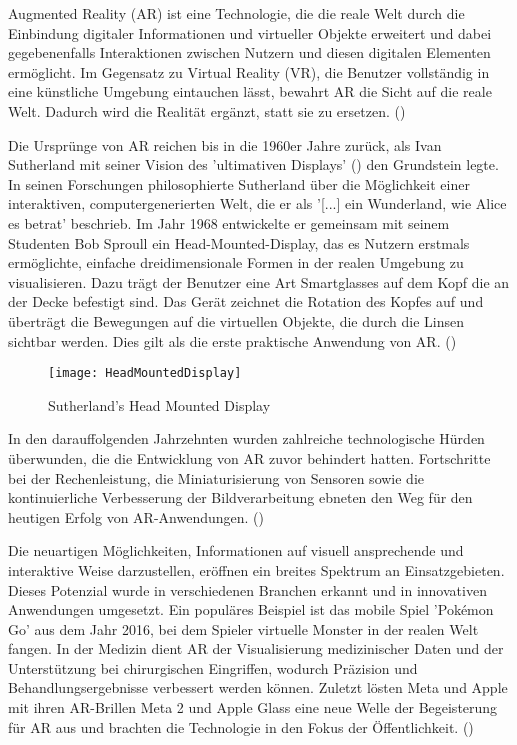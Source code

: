 Augmented Reality (AR) ist eine Technologie, die die reale Welt durch die Einbindung digitaler Informationen und virtueller Objekte erweitert und dabei gegebenenfalls Interaktionen zwischen Nutzern und diesen digitalen Elementen ermöglicht. Im Gegensatz zu Virtual Reality (VR), die Benutzer vollständig in eine künstliche Umgebung eintauchen lässt, bewahrt AR die Sicht auf die reale Welt. Dadurch wird die Realität ergänzt, statt sie zu ersetzen. (\cite{azuma1997ar})

Die Ursprünge von AR reichen bis in die 1960er Jahre zurück, als Ivan Sutherland mit seiner Vision des 'ultimativen Displays' (\citet{sutherland1965ultimateDisplay}) den Grundstein legte. In seinen Forschungen philosophierte Sutherland über die Möglichkeit einer interaktiven, computergenerierten Welt, die er als '[...] ein Wunderland, wie Alice es betrat' beschrieb. Im Jahr 1968 entwickelte er gemeinsam mit seinem Studenten Bob Sproull ein Head-Mounted-Display, das es Nutzern erstmals ermöglichte, einfache dreidimensionale Formen in der realen Umgebung zu visualisieren. Dazu trägt der Benutzer eine Art Smartglasses auf dem Kopf die an der Decke befestigt sind. Das Gerät zeichnet die Rotation des Kopfes auf und überträgt die Bewegungen auf die virtuellen Objekte, die durch die Linsen sichtbar werden. Dies gilt als die erste praktische Anwendung von AR. (\cite{sutherland19683dDisplay, doerner2022virtual})

\begin{figure}
    \centering
    \texttt{[image: HeadMountedDisplay]}
    \caption{Sutherland's Head Mounted Display\label{fig:HeadMountedDisplay}}\par
\end{figure}

In den darauffolgenden Jahrzehnten wurden zahlreiche technologische Hürden überwunden, die die Entwicklung von AR zuvor behindert hatten. Fortschritte bei der Rechenleistung, die Miniaturisierung von Sensoren sowie die kontinuierliche Verbesserung der Bildverarbeitung ebneten den Weg für den heutigen Erfolg von AR-Anwendungen. (\cite{doerner2022virtual})

Die neuartigen Möglichkeiten, Informationen auf visuell ansprechende und interaktive Weise darzustellen, eröffnen ein breites Spektrum an Einsatzgebieten. Dieses Potenzial wurde in verschiedenen Branchen erkannt und in innovativen Anwendungen umgesetzt. Ein populäres Beispiel ist das mobile Spiel 'Pokémon Go' aus dem Jahr 2016, bei dem Spieler virtuelle Monster in der realen Welt fangen. In der Medizin dient AR der Visualisierung medizinischer Daten und der Unterstützung bei chirurgischen Eingriffen, wodurch Präzision und Behandlungsergebnisse verbessert werden können. Zuletzt lösten Meta und Apple mit ihren AR-Brillen Meta 2 und Apple Glass eine neue Welle der Begeisterung für AR aus und brachten die Technologie in den Fokus der Öffentlichkeit. (\cite{doerner2022virtual, boulanger2024applications})

